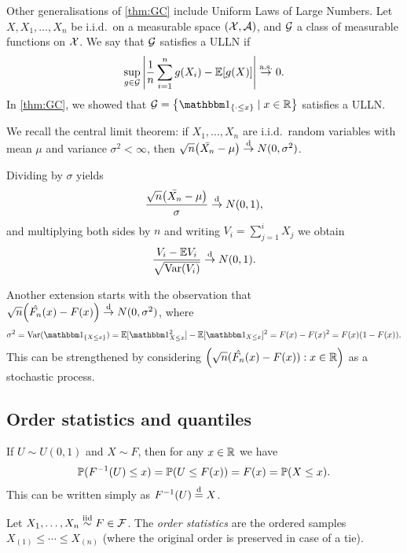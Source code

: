 \begin{discussion}
	Other generalisations of \cref{thm:GC} include Uniform Laws of Large Numbers. Let $X, X_1, \dotsc, X_n$ be i.i.d.\ on a measurable space $(\mathcal X, \mathcal A)$, and $\mathcal G$ a class of measurable functions on $\mathcal X$. We say that $\mathcal G$ satisfies a ULLN if 
	\[
	\sup_{g \in \mathcal G} \abs{\frac1n \sum_{i=1}^n g(X_i) - \mathbb E[g(X)]} \overset{\mathrm{a.s.}}{\to} 0. 
	\]
	In \cref{thm:GC}, we showed that $\Cal  G = \qty{ \ind_\qty{\cdot \leq x} \mid x \in \RR}$ satisfies a ULLN. 
\end{discussion}



\begin{recap}
    We recall the central limit theorem: if $X_1, \dotsc, X_n$ are i.i.d.\ random variables with mean $\mu$ and variance $\sigma^2 < \infty$, then $\sqrt n \qty(\bar{X_n} - \mu) \overset{\mathrm{d}}{\to} N(0, \sigma^2)$. 
    
    Dividing by $\sigma$ yields
    \[
    \frac{\sqrt n \qty(\bar{X_n} - \mu)}{\sigma} \overset{\mathrm{d}}{\to} N(0, 1), 
    \]
    and multiplying both sides by $n$ and writing $V_i = \sum_{j=1}^i X_j$ we obtain
    \[
    \frac{V_i - \mathbb E V_i}{\sqrt{\operatorname{Var}(V_i)}} \overset{\mathrm{d}}{\to} N(0, 1).
    \]
\end{recap}
\begin{discussion}
Another extension starts with the observation that $\sqrt n \qty(\hat{F_n}(x) - F(x)) \overset{\mathrm{d}}{\to} N(0, \sigma^2)$, where
\[
\sigma^2 = \Var(\ind_\qty{X \leq x}) = \EE[\ind_{X \leq x}^2] - \EE[\ind_{X \leq x}]^2 = F(x) - F(x)^2 = F(x)(1 - F(x)). 
\]
This can be strengthened by considering $\qty(\sqrt n (\hat{F_n}(x) - F(x)) : x \in \mathbb R)$ as a stochastic process. 
\end{discussion}


\subsection{Order statistics and quantiles}
\begin{recap}
			
	If $U \sim U(0, 1)$ and $X \sim F$, then for any $x \in \mathbb R$ we have
	\[
	\mathbb P(F^{-1}(U) \leq x) = \mathbb P(U \leq F(x)) = F(x) = \mathbb P(X \leq x). 
	\]
	This can be written simply as $F^{-1}(U) \overset{\mathrm{d}}= X$. 
\end{recap}
\begin{definition}
    Let $X_1, \dotsc, X_n \overset{\mathrm{iid}}{\sim} F \in \mathcal F$. The \emph{order statistics} are the ordered samples $X_{(1)} \leq \dotsb \leq X_{(n)}$ (where the original order is preserved in case of a tie). 
\end{definition}

